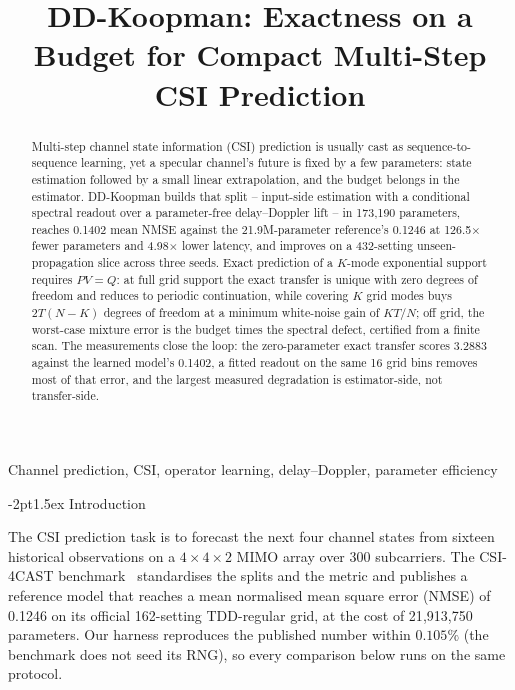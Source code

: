 \documentclass{article}
\title{DD-Koopman: Exactness on a Budget for Compact Multi-Step CSI Prediction}
\makeatletter
\renewcommand\section{\@startsection{section}{1}{\z@}%
  {-2pt}{1.5ex}%
  {\normalfont\Large\bfseries}}
\makeatother
\begin{document}
\ninept
\maketitle

\begin{abstract}
Multi-step channel state information (CSI) prediction is usually cast as
sequence-to-sequence learning, yet a specular channel's future is fixed by
a few parameters: state estimation followed by a small linear
extrapolation, and the budget belongs in the estimator. DD-Koopman builds
that split -- input-side estimation with a conditional spectral readout
over a parameter-free delay--Doppler lift -- in 173{,}190 parameters,
reaches 0.1402 mean NMSE against the 21.9M-parameter reference's 0.1246 at
126.5$\times$ fewer parameters and 4.98$\times$ lower latency, and improves
on a 432-setting unseen-propagation slice across three seeds. Exact
prediction of a $K$-mode exponential support requires $PV=Q$: at full grid
support the exact transfer is unique with zero degrees of freedom and
reduces to periodic continuation, while covering $K$ grid modes buys
$2T(N{-}K)$ degrees of freedom at a minimum white-noise gain of $KT/N$; off
grid, the worst-case mixture error is the budget times the spectral
defect, certified from a finite scan. The measurements close the loop: the
zero-parameter exact transfer scores 3.2883 against the learned model's
0.1402, a fitted readout on the same 16 grid bins removes most of that
error, and the largest measured degradation is estimator-side, not
transfer-side.
\end{abstract}

\begin{keywords}
Channel prediction, CSI, operator learning, delay--Doppler, parameter efficiency
\end{keywords}

\section{Introduction}
\label{sec:intro}

The CSI prediction task is to forecast the next four channel states from
sixteen historical observations on a
$4{\times}4{\times}2$ MIMO array over 300 subcarriers. The
CSI-4CAST benchmark~\cite{csi4cast_2025} standardises the
splits and the metric and publishes a reference model that reaches a mean
normalised mean square error (NMSE) of 0.1246 on its official 162-setting
TDD-regular grid, at the cost of 21{,}913,750 parameters. Our harness
reproduces the published
number within $0.105\%$ (the benchmark does not seed its RNG), so every
comparison below runs on the same protocol.
\end{document}
